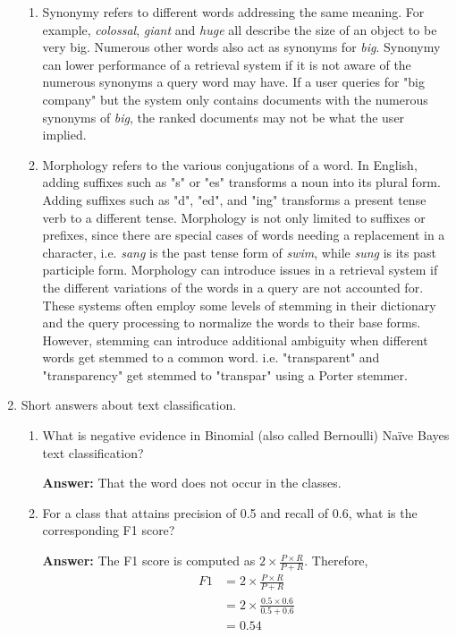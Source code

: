 \documentclass[11pt]{article}
\begin{document}
\begin{enumerate}
\begin{enumerate}
          \item Synonymy refers to different words addressing the same meaning. For example, \textit{colossal}, \textit{giant} and \textit{huge} all describe the size of an object to be very big. Numerous other words also act as synonyms for \textit{big}.
                Synonymy can lower performance of a retrieval system if it is not aware of the numerous synonyms a query word may have. If a user queries for "big company" but the system only contains documents with the numerous synonyms of \textit{big}, the ranked documents may not be what the user implied.

          \item Morphology refers to the various conjugations of a word. In English, adding suffixes such as "s" or "es" transforms a noun into its plural form. Adding suffixes such as "d", "ed", and "ing" transforms a present tense verb to a different tense. Morphology is not only limited to suffixes or prefixes, since there are special cases of words needing a replacement in a character, i.e. \textit{sang} is the past tense form of \textit{swim}, while \textit{sung} is its past participle form.
                Morphology can introduce issues in a retrieval system if the different variations of the words in a query are not accounted for. These systems often employ some levels of stemming in their dictionary and the query processing to normalize the words to their base forms. However, stemming can introduce additional ambiguity when different words get stemmed to a common word. i.e. "transparent" and "transparency" get stemmed to "transpar" using a Porter stemmer.
        \end{enumerate}

  \item Short answers about text classification.
        \begin{enumerate}
          \item What is negative evidence in Binomial (also called Bernoulli) Naïve Bayes text classification?

                \textbf{Answer:} That the word does not occur in the classes.

          \item For a class that attains precision of 0.5 and recall of 0.6, what is the corresponding F1 score?

                \textbf{Answer:} The F1 score is computed as $2 \times \frac{P\times R}{P+R}$. Therefore,
                \begin{align*}
                  F1 & = 2 \times \frac{P\times R}{P+R}         \\
                     & = 2 \times \frac{0.5\times 0.6}{0.5+0.6} \\
                     & = 0.54
                \end{align*}


\end{enumerate}
\end{enumerate}
\end{document}
